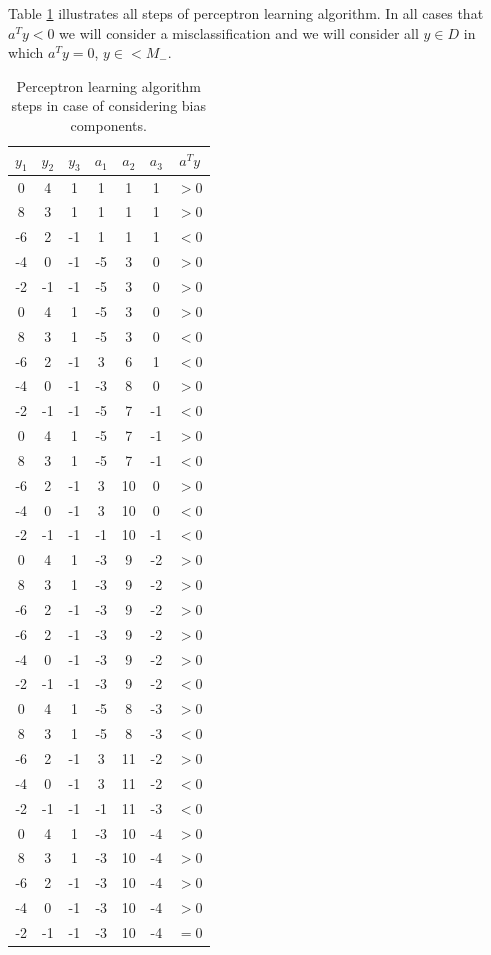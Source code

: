 \documentclass[12pt]{article}
\begin{document}
\begin{itemize}
Table \ref{tbl:4-1} illustrates all steps of perceptron learning algorithm. In all cases that $a^Ty < 0$ we will consider a misclassification and we will consider all $y \in D$ in which $a^T y = 0$, $y \in < M_-$. 

\begin{table}
\centering
\caption{Perceptron learning algorithm steps in case of considering bias components.}
\label{tbl:4-1}
\begin{tabular}{c | c | c | | c | c | c | | c }
$y_1$ & $y_2$ & $y_3$ & $a_1$ & $a_2$ & $a_3$ & $a^Ty$ \\
\hline \hline
0 &4 &1 &1 &1 &1 &$>$0\\ 
8 &3 &1 &1 &1 &1 &$>$0\\ 
-6 &2 &-1 &1 &1 &1 &$<$0\\
-4 &0 &-1 &-5 &3 &0 &$>$0\\
-2 &-1 &-1 &-5 &3 &0 &$>$0\\ \hline \hline
0 &4 &1 &-5 &3 &0 &$>$0\\
8 &3 &1 &-5 &3 &0 &$<$0\\
-6 &2 &-1 &3 &6 &1 &$<$0\\
-4 &0 &-1 &-3 &8 &0 &$>$0\\
-2 &-1 &-1 &-5 &7 &-1 &$<$0\\\hline \hline
0 &4 &1 &-5 &7 &-1 &$>$0\\
8 &3 &1 &-5 &7 &-1 &$<$0\\
-6 &2 &-1 &3 &10 &0 &$>$0\\
-4 &0 &-1 &3 &10 &0 &$<$0\\
-2 &-1 &-1 &-1 &10 &-1 &$<$0\\ \hline \hline
0 &4 &1 &-3 &9 &-2 &$>$0\\
8 &3 &1 &-3 &9 &-2 &$>$0\\
-6 &2 &-1 &-3 &9 &-2 &$>$0\\
-6 &2 &-1 &-3 &9 &-2 &$>$0\\
-4 &0 &-1 &-3 &9 &-2 &$>$0\\
-2 &-1 &-1 &-3 &9 &-2 &$<$0\\ \hline \hline
0 &4 &1 &-5 &8 &-3 &$>$0\\
8 &3 &1 &-5 &8 &-3 &$<$0\\
-6 &2 &-1 &3 &11 &-2 &$>$0\\
-4 &0 &-1 &3 &11 &-2 &$<$0\\
-2 &-1 &-1 &-1 &11 &-3 &$<$0\\ \hline \hline
0 &4 &1 &-3 &10 &-4 &$>$0\\
8 &3 &1 &-3 &10 &-4 &$>$0\\
-6 &2 &-1 &-3 &10 &-4 &$>$0\\
-4 &0 &-1 &-3 &10 &-4 &$>$0\\
-2 &-1 &-1 &-3 &10 &-4 &$=$0\\\hline
\end{tabular}
\end{table}



\end{itemize}
\end{document}

